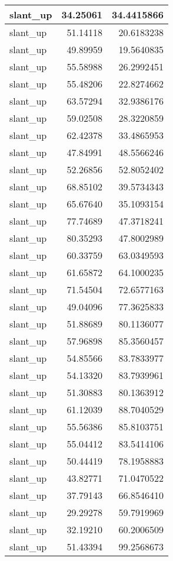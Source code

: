 \documentclass[
]{book}
\theoremstyle{definition}
\theoremstyle{definition}
\theoremstyle{definition}
\theoremstyle{definition}
\theoremstyle{remark}
\begin{document}
\begin{tabular}{l|r|r}
\hline
slant\_up & 34.25061 & 34.4415866\\
\hline
slant\_up & 51.14118 & 20.6183238\\
\hline
slant\_up & 49.89959 & 19.5640835\\
\hline
slant\_up & 55.58988 & 26.2992451\\
\hline
slant\_up & 55.48206 & 22.8274662\\
\hline
slant\_up & 63.57294 & 32.9386176\\
\hline
slant\_up & 59.02508 & 28.3220859\\
\hline
slant\_up & 62.42378 & 33.4865953\\
\hline
slant\_up & 47.84991 & 48.5566246\\
\hline
slant\_up & 52.26856 & 52.8052402\\
\hline
slant\_up & 68.85102 & 39.5734343\\
\hline
slant\_up & 65.67640 & 35.1093154\\
\hline
slant\_up & 77.74689 & 47.3718241\\
\hline
slant\_up & 80.35293 & 47.8002989\\
\hline
slant\_up & 60.33759 & 63.0349593\\
\hline
slant\_up & 61.65872 & 64.1000235\\
\hline
slant\_up & 71.54504 & 72.6577163\\
\hline
slant\_up & 49.04096 & 77.3625833\\
\hline
slant\_up & 51.88689 & 80.1136077\\
\hline
slant\_up & 57.96898 & 85.3560457\\
\hline
slant\_up & 54.85566 & 83.7833977\\
\hline
slant\_up & 54.13320 & 83.7939961\\
\hline
slant\_up & 51.30883 & 80.1363912\\
\hline
slant\_up & 61.12039 & 88.7040529\\
\hline
slant\_up & 55.56386 & 85.8103751\\
\hline
slant\_up & 55.04412 & 83.5414106\\
\hline
slant\_up & 50.44419 & 78.1958883\\
\hline
slant\_up & 43.82771 & 71.0470522\\
\hline
slant\_up & 37.79143 & 66.8546410\\
\hline
slant\_up & 29.29278 & 59.7919969\\
\hline
slant\_up & 32.19210 & 60.2006509\\
\hline
slant\_up & 51.43394 & 99.2568673\\

\end{tabular}
\end{document}
